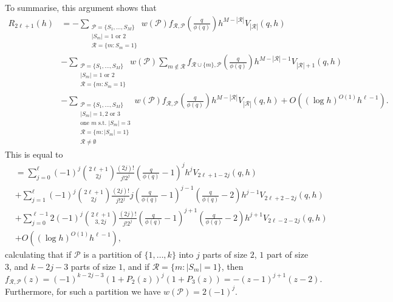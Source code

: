 \documentclass[11pt,letterpaper]{amsart}
\newcommand{\abs}[1]{\left\lvert #1\right\rvert}
\theoremstyle{definition}
\begin{document}
To summarise, this argument shows that 
\begin{align*}
R_{2\ell+1}(h) &= -\sum_{\substack{\mathcal P = \{S_1, \dots, S_M\} \\ |S_m| = 1 \text{ or } 2 \\ \mathcal R = \{m:S_m = 1\}}} w(\mathcal P)  f_{\mathcal R,\mathcal P}\left(\frac{q}{\phi(q)}\right)h^{M-|\mathcal R|}V_{|\mathcal R|}(q,h) \\
&- \sum_{\substack{\mathcal P = \{S_1, \dots, S_M\} \\ |S_m| = 1 \text{ or } 2 \\ \mathcal R = \{m:S_m = 1\}}} w(\mathcal P)  \sum_{m \not\in \mathcal R} f_{\mathcal R \cup \{m\},\mathcal P}\left(\frac{q}{\phi(q)}\right) h^{M-|\mathcal R|-1} V_{|\mathcal R|+1}(q,h) \\
&-\sum_{\substack{\mathcal P = \{S_1, \dots, S_M\} \\ |S_m| = 1, 2 \text{ or } 3 \\ \text{one $m$ s.t. $|S_m| = 3$} \\ \mathcal R = \{m:|S_m| = 1\} \\ \mathcal R \ne \emptyset}} w(\mathcal P) f_{\mathcal R,\mathcal P} \left(\frac{q}{\phi(q)}\right) h^{M-|\mathcal R|} V_{|\mathcal R|}(q,h) + O((\log h)^{O(1)}h^{\ell-1}).
\end{align*}
This is equal to
\begin{align*}
&= \sum_{j=0}^{\ell} (-1)^{j} \binom{2\ell+1}{2j}\frac{(2j)!}{j!2^j}\left(\frac{q}{\phi(q)}-1\right)^jh^jV_{2\ell+1-2j}(q,h) \\
&+ \sum_{j=1}^{\ell} (-1)^{j} \binom{2\ell+1}{2j}\frac{(2j)!}{j!2^j}j\left(\frac{q}{\phi(q)}-1\right)^{j-1} \left(\frac{q}{\phi(q)} - 2\right) h^{j-1}V_{2\ell+2-2j}(q,h) \\
&+\sum_{j=0}^{\ell-1} 2(-1)^j\binom{2\ell+1}{3,2j}\frac{(2j)!}{j!2^j} \left(\frac{q}{\phi(q)}-1\right)^{j+1}\left(\frac{q}{\phi(q)}-2\right)h^{j+1}V_{2\ell-2-2j}(q,h) \\
&+ O((\log h)^{O(1)}h^{\ell-1}),
\end{align*}
calculating that if $\mathcal{P}$ is a partition of $\{1,\ldots,k\}$ into $j$ parts of size $2$, $1$ part of size $3$, and $k-2j-3$ parts of size $1$, and if $\mathcal{R}=\{m: \abs{S_m}=1\}$, then
\[f_{\mathcal R,\mathcal P}(z) = (-1)^{k-2j-3}(1+P_2(z))^{j}(1+P_3(z))=-(z-1)^{j+1}(z-2).\]
Furthermore, for such a partition we have $w(\mathcal{P})=2(-1)^{j}$. 
\end{document}
